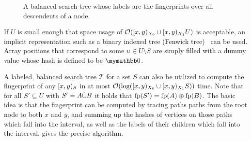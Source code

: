 \begin{figure*}
\begin{scaletikzpicturetowidth}{\textwidth}
\end{scaletikzpicturetowidth}

\caption{
A balanced search tree whose labels are the fingerprints over all descendents of a node.
}

\label{fig:fp-tree}
\end{figure*}

If $U$ is small enough that space usage of $\mathcal{O}([{x},{y})_{X_0} \cup [{x},{y})_{X_1}{U})$ is acceptable, an implicit representation such as a binary indexed tree (Fenwick tree)~\cite{fenwick1994new} can be used. Array positions that correspond to some $u \in U \setminus S$ are simply filled with a dummy value whose hash is defined to be $\neutraladd$.

A labeled, balanced search tree $\mathcal{T}$ for a set $S$ can also be utilized to compute the fingerprint of any $[{x},{y})_{S}$ in at most $\mathcal{O}(\log([{x},{y})_{X_0} \cup [{x},{y})_{X_1}{S}))$ time. Note that for all $S' \subseteq U$ with $S' = {A} \dot{\cup} {B}$ it holds that $\operatorname{fp}(S') = {\operatorname{fp}(A)} \oplus {\operatorname{fp}(B)}$. The basic idea is that the fingerprint can be computed by tracing paths paths from the root node to both $x$ and $y$, and summing up the hashes of vertices on those paths which fall into the interval, as well as the labels of their children which fall into the interval.  gives the precise algorithm.

